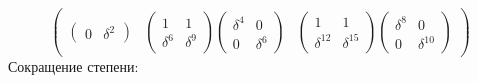 \[\begin{pmatrix}
\begin{pmatrix}
            0 & \delta^2
        \end{pmatrix}
        &
        \begin{pmatrix}
            1        & 1        \\
            \delta^6 & \delta^9
        \end{pmatrix}
        \begin{pmatrix}
            \delta^4 & 0        \\
            0        & \delta^6
        \end{pmatrix}
        &
        \begin{pmatrix}
            1           & 1           \\
            \delta^{12} & \delta^{15}
        \end{pmatrix}
        \begin{pmatrix}
            \delta^8 & 0           \\
            0        & \delta^{10}
        \end{pmatrix}
    \end{pmatrix}
\]
Сокращение степени:
